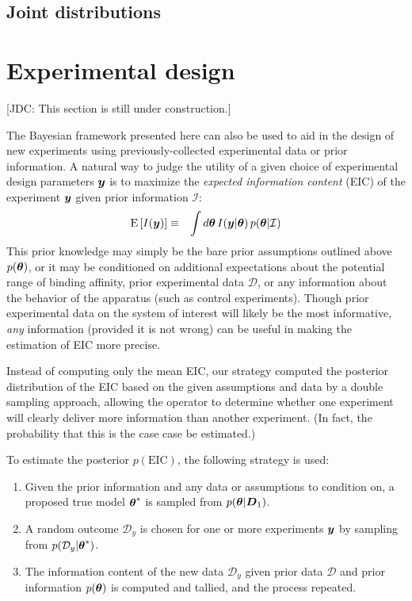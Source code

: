 \documentclass[aps,pre,twocolumn,nofootinbib,superscriptaddress,linenumbers]{revtex4-1}
\newcommand{\bfv}[1]{{\mbox{\boldmath{$#1$}}}}
\newcommand{\Ept}[1] {{\mathrm E}\left[ #1 \right]}
\begin{document}
\subsection{Joint distributions}



\section{Experimental design}
\label{section:experimental-design}

{\color{red}[JDC: This section is still under construction.]}

The Bayesian framework presented here can also be used to aid in the design of new experiments using previously-collected experimental data or prior information.
A natural way to judge the utility of a given choice of experimental design parameters $\bfv{y}$ is to maximize the \emph{expected information content} (EIC) of the experiment $\bfv{y}$ given prior information $\mathcal{I}$:
\begin{eqnarray}
\Ept{I(\bfv{y})} &\equiv& \int d\bfv{\theta} \, I(\bfv{y} | \bfv{\theta}) \, p(\bfv{\theta} | \mathcal{I})
\end{eqnarray}
This prior knowledge may simply be the bare prior assumptions outlined above $p(\bfv{\theta})$, or it may be conditioned on additional expectations about the potential range of binding affinity, prior experimental data $\mathcal{D}$, or any information about the behavior of the apparatus (such as control experiments).
Though prior experimental data on the system of interest will likely be the most informative, \emph{any} information (provided it is not wrong) can be useful in making the estimation of EIC more precise.

Instead of computing only the mean EIC, our strategy computed the posterior distribution of the EIC based on the given assumptions and data by a double sampling approach, allowing the operator to determine whether one experiment will clearly deliver more information than another experiment.
(In fact, the probability that this is the case case be estimated.)

To estimate the posterior $p(\mathrm{EIC})$, the following strategy is used:
\begin{enumerate}
  \item Given the prior information and any data or assumptions to condition on, a proposed true model $\bfv{\theta}^*$ is sampled from $p(\bfv{\theta} | \bfv{D}_1)$.
  \item A random outcome $\mathcal{D}_y$ is chosen for one or more experiments $\bfv{y}$ by sampling from $p(\mathcal{D}_y | \bfv{\theta}^*)$.
  \item The information content of the new data $\mathcal{D}_y$ given prior data $\mathcal{D}$ and prior information $p(\bfv{\theta})$ is computed and tallied, and the process repeated.
\end{enumerate}
\end{document}
